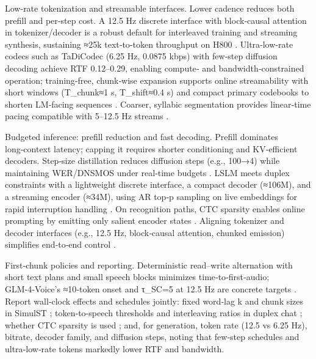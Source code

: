 \documentclass{article}
\begin{document}
Low-rate tokenization and streamable interfaces. Lower cadence reduces both prefill and per‑step cost. A 12.5 Hz discrete interface with block‑causal attention in tokenizer/decoder is a robust default for interleaved training and streaming synthesis, sustaining ≈25k text‑to‑token throughput on H800 \cite{zeng2024scalingspeechtextpretrainingsyntheticint}. Ultra‑low‑rate codecs such as TaDiCodec (6.25 Hz, 0.0875 kbps) with few‑step diffusion decoding achieve RTF 0.12–0.29, enabling compute‑ and bandwidth‑constrained operation; training‑free, chunk‑wise expansion supports online streamability with short windows (T_chunk≈1 s, T_shift≈0.4 s) and compact primary codebooks to shorten LM‑facing sequences \cite{wang2025tadicodectextawarediffusionspeechtokeniz,kando2025exploringeffectsegmentationvocabularysiz}. Coarser, syllabic segmentation provides linear‑time pacing compatible with 5–12.5 Hz streams \cite{cho2025sylbersyllabicembeddingrepresentationspe}.

Budgeted inference: prefill reduction and fast decoding. Prefill dominates long‑context latency; capping it requires shorter conditioning and KV‑efficient decoders. Step‑size distillation reduces diffusion steps (e.g., 100→4) while maintaining WER/DNSMOS under real‑time budgets \cite{yang2025diffsoundstreamefficientspeechtokenizati}. LSLM meets duplex constraints with a lightweight discrete interface, a compact decoder (≈106M), and a streaming encoder (≈34M), using AR top‑p sampling on live embeddings for rapid interruption handling \cite{ma2024languagemodelcanlistenwhilespeaking}. On recognition paths, CTC sparsity enables online prompting by emitting only salient encoder states \cite{tsunoo2024decoderonlyarchitecturespeechrecognition}. Aligning tokenizer and decoder interfaces (e.g., 12.5 Hz, block‑causal attention, chunked emission) simplifies end‑to‑end control \cite{zeng2024scalingspeechtextpretrainingsyntheticint}.

First‑chunk policies and reporting. Deterministic read–write alternation with short text plans and small speech blocks minimizes time‑to‑first‑audio; GLM‑4‑Voice’s ≈10‑token onset and τ_SC=5 at 12.5 Hz are concrete targets \cite{zeng2024glm4voicetowardsintelligenthumanlikeends,cui2025thinkbeforeyoutalkenhancingmeaningfuldia}. Report wall‑clock effects and schedules jointly: fixed word‑lag k and chunk sizes in SimulST \cite{guo2025streamuniachievingstreamingspeechtransla}; token‑to‑speech thresholds and interleaving ratios in duplex chat \cite{zeng2024glm4voicetowardsintelligenthumanlikeends}; whether CTC sparsity is used \cite{tsunoo2024decoderonlyarchitecturespeechrecognition}; and, for generation, token rate (12.5 vs 6.25 Hz), bitrate, decoder family, and diffusion steps, noting that few‑step schedules and ultra‑low‑rate tokens markedly lower RTF and bandwidth.
\end{document}
